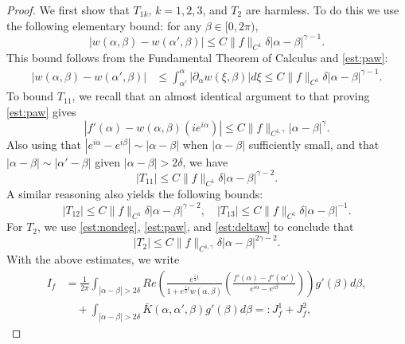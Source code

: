 \documentclass[10pt,a4paper]{amsart}
\newcommand{\p}{\partial}
\newcommand{\palpha}{\p_\alpha}
\begin{document}
\begin{proof}
    We first show that $T_{1k}$, $k = 1,2,3$, and $T_2$ are harmless. To do this we use the following elementary bound: for any $\beta \in [0,2\pi)$,
    \begin{equation}
        \label{est:deltaw}
        |w(\alpha,\beta) - w(\alpha',\beta)| \le C\|f\|_{C^1} \delta |\alpha - \beta|^{\gamma-1}.
    \end{equation}
    This bound follows from the Fundamental Theorem of Calculus and \eqref{est:paw}:
    \begin{align*}
        |w(\alpha,\beta) - w(\alpha',\beta)| &\le \int_{\alpha'}^\alpha |\palpha w(\xi,\beta)| d\xi \le C\|f\|_{C^1}\delta|\alpha - \beta|^{\gamma - 1}.
    \end{align*}
    To bound $T_{11}$, we recall that an almost identical argument to that proving \eqref{est:paw} gives 
    \begin{equation}\label{est:pawaux1}
    |f'(\alpha) - w(\alpha,\beta) (ie^{i\alpha})| \le C\|f\|_{C^{1,\gamma}} |\alpha - \beta|^\gamma.
    \end{equation}
    Also using that $|e^{i\alpha} - e^{i\beta}|\sim |\alpha - \beta|$ when $|\alpha - \beta|$ sufficiently small, and that $|\alpha - \beta| \sim |\alpha' - \beta|$ given $|\alpha - \beta| > 2\delta$, we have
    \begin{equation}
        \label{est:T11}
        |T_{11}| \le C\|f\|_{C^{1}} \delta |\alpha - \beta|^{\gamma-2}.
    \end{equation}
    A similar reasoning also yields the following bounds:
    \begin{equation}
        \label{est:T123}
        |T_{12}| \le C\|f\|_{C^{1}} \delta |\alpha - \beta|^{\gamma-2},\quad |T_{13}| \le C\|f\|_{C^{1}} \delta|\alpha - \beta|^{-1}.
    \end{equation}
    For $T_2$, we use \eqref{est:nondeg}, \eqref{est:paw}, and \eqref{est:deltaw} to conclude that
    \begin{equation}
        \label{est:T2}
        |T_2| \le C\|f\|_{C^{1,\gamma}} \delta |\alpha - \beta|^{2\gamma-2}.
    \end{equation}
    With the above estimates, we write
    \begin{align*}
        I_f &= \frac{1}{2\pi}\int_{|\alpha - \beta| > 2\delta}Re\left(\frac{e^{\frac{i}{2}t}}{1+ e^{\frac{i}{2}t}w(\alpha,\beta)}\left(\frac{f'(\alpha) - f'(\alpha')}{e^{i\alpha} - e^{i\beta}}\right)\right)g'(\beta) d\beta,\\
        &\quad + \int_{|\alpha - \beta| > 2\delta}\bar{K}(\alpha,\alpha',\beta)g'(\beta) d\beta =: J_f^1 + J_f^2,

\end{align*}
\end{proof}
\end{document}
